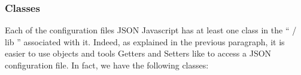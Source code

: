 

\subsubsection{Classes}




Each of the configuration files JSON Javascript has at least one class in the `` / lib '' associated with it. Indeed, as explained in the previous paragraph, it is easier to use objects and tools Getters and Setters like to access a JSON configuration file. In fact, we have the following classes:

